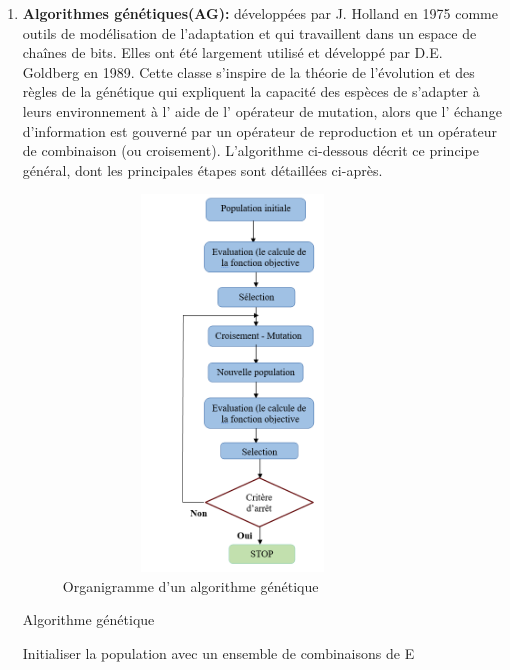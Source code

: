 \begin{enumerate}[label=\alph*)]
	\item \textbf{Algorithmes génétiques(AG):} développées par J. Holland en 1975 comme outils de modélisation de l’adaptation et qui travaillent dans un espace de chaînes de bits. Elles ont été largement utilisé et développé par D.E. Goldberg en 1989. Cette classe s’inspire de la théorie de l’évolution et des règles de la génétique qui expliquent la capacité des espèces de s’adapter à leurs environnement à l’ aide de l’ opérateur de mutation, alors que l’ échange               	d’information est gouverné par un opérateur de reproduction et un opérateur de combinaison (ou croisement). L’algorithme ci-dessous décrit ce principe général, dont les principales étapes sont détaillées ci-après.\\

\begin{figure}[H]
	\centering
	\includegraphics[width=9cm,height=10cm]{Chap2/6.png}
	\caption{Organigramme d’un algorithme génétique}
	\label{fig:OAG}
\end{figure}

\begin{algorithm}[H]
\caption{Algorithme génétique}
\SetAlgoLined
\DontPrintSemicolon

Initialiser la population avec un ensemble de combinaisons de E \;


\end{algorithm}
\end{enumerate}
